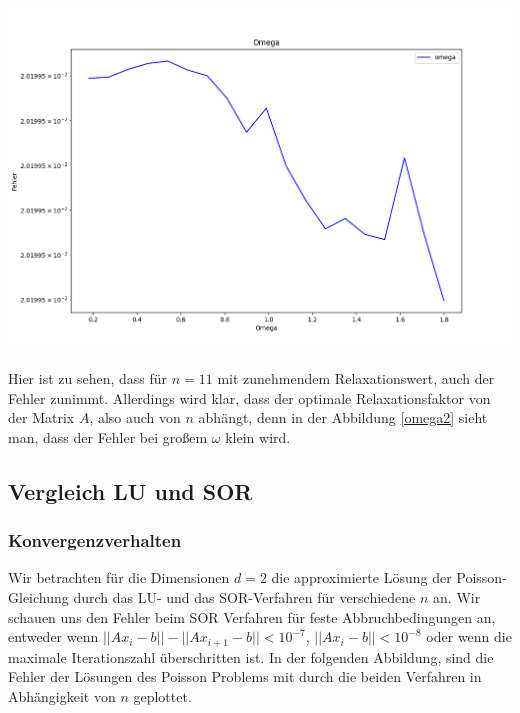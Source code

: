 \documentclass[smallheadings]{scrartcl}
\theoremstyle{definition}
\begin{document}
\begin{minipage}{\textwidth}

 \centering
 \includegraphics[scale = 0.5]{Omega2}
 	\label{omega2}

 \end{minipage}
		 
	Hier ist zu sehen, dass für $n=11$ mit zunehmendem Relaxationswert, auch der Fehler zunimmt. 
	Allerdings wird klar, dass der optimale Relaxationsfaktor von der Matrix $A$, also auch von $n$ abhängt, denn in der Abbildung \ref{omega2} sieht man, dass der Fehler bei großem $\omega $ klein wird. 
\subsection{Vergleich LU und SOR}
\subsubsection{Konvergenzverhalten}

Wir betrachten für die Dimensionen $d=2$ die approximierte Lösung der Poisson-Gleichung durch das LU- und das SOR-Verfahren für verschiedene  $n$ an.   Wir schauen uns den Fehler beim SOR Verfahren für feste Abbruchbedingungen an,  entweder wenn $||Ax_i-b||-||Ax_{i+1}-b||<10^{-7}$, $||Ax_i-b||<10^{-8}$ oder wenn die maximale Iterationszahl überschritten ist.  In der folgenden Abbildung,  sind die Fehler der Lösungen des Poisson Problems mit durch die beiden Verfahren in Abhängigkeit von $n$ geplottet.
\end{document}
